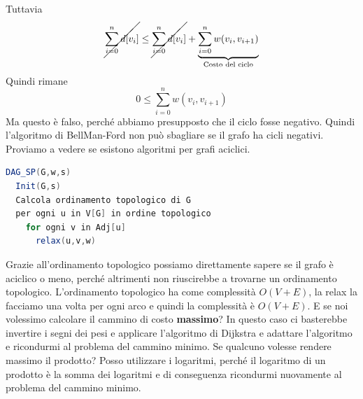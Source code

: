 \documentclass[a4paper]{article}
\begin{document}
Tuttavia 
\[  \cancel{\sum_{i=0}^n d[v_i]} \le \cancel{\sum_{i=0}^{n} d[v_i]} + \underbrace{\sum_{i=0}^{n} w(v_i, v_{i+1})}_{\text{Costo del ciclo}} \]
Quindi rimane
\[0 \le \sum_{i=0}^{n} w(v_i, v_{i+1})\]
Ma questo è falso, perché abbiamo presupposto che il ciclo fosse negativo. Quindi 
l'algoritmo di BellMan-Ford non può sbagliare se il grafo ha cicli negativi.
Proviamo a vedere se esistono algoritmi per grafi aciclici.
\begin{lstlisting}[language=Scala]
DAG_SP(G,w,s)
  Init(G,s)
  Calcola ordinamento topologico di G
  per ogni u in V[G] in ordine topologico
    for ogni v in Adj[u]
      relax(u,v,w)
\end{lstlisting}
\noindent
Grazie all'ordinamento topologico possiamo direttamente sapere se il grafo è aciclico o meno, perché altrimenti non riuscirebbe a trovarne
un ordinamento topologico. L'ordinamento topologico ha come complessità $O(V+E)$, la relax la facciamo una volta per ogni arco e quindi la complessità è $O(V+E)$.
E se noi volessimo calcolare il cammino di costo \textbf{massimo}? In questo caso ci basterebbe invertire i segni dei pesi e applicare l'algoritmo di Dijkstra e adattare
l'algoritmo e ricondurmi al problema del cammino minimo. 
Se qualcuno volesse rendere massimo il prodotto? Posso utilizzare i logaritmi, perché il logaritmo di un prodotto è la somma dei logaritmi e di conseguenza 
ricondurmi nuovamente al problema del cammino minimo.
\end{document}
